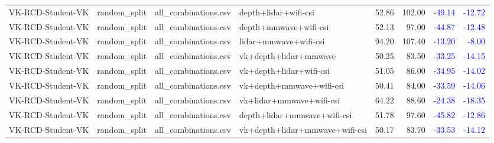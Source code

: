 \documentclass[10pt]{article}
\begin{document}
\begin{longtable}{llllrrrr}
VK-RCD-Student-VK & random\_split & all\_combinations.csv & depth+lidar+wifi-csi & 52.86 & 102.00 & \textcolor{blue}{-49.14} & \textcolor{blue}{-12.72}\\
VK-RCD-Student-VK & random\_split & all\_combinations.csv & depth+mmwave+wifi-csi & 52.13 & 97.00 & \textcolor{blue}{-44.87} & \textcolor{blue}{-12.48}\\
VK-RCD-Student-VK & random\_split & all\_combinations.csv & lidar+mmwave+wifi-csi & 94.20 & 107.40 & \textcolor{blue}{-13.20} & \textcolor{blue}{-8.00}\\
VK-RCD-Student-VK & random\_split & all\_combinations.csv & vk+depth+lidar+mmwave & 50.25 & 83.50 & \textcolor{blue}{-33.25} & \textcolor{blue}{-14.15}\\
VK-RCD-Student-VK & random\_split & all\_combinations.csv & vk+depth+lidar+wifi-csi & 51.05 & 86.00 & \textcolor{blue}{-34.95} & \textcolor{blue}{-14.02}\\
VK-RCD-Student-VK & random\_split & all\_combinations.csv & vk+depth+mmwave+wifi-csi & 50.41 & 84.00 & \textcolor{blue}{-33.59} & \textcolor{blue}{-14.06}\\
VK-RCD-Student-VK & random\_split & all\_combinations.csv & vk+lidar+mmwave+wifi-csi & 64.22 & 88.60 & \textcolor{blue}{-24.38} & \textcolor{blue}{-18.35}\\
VK-RCD-Student-VK & random\_split & all\_combinations.csv & depth+lidar+mmwave+wifi-csi & 51.78 & 97.60 & \textcolor{blue}{-45.82} & \textcolor{blue}{-12.86}\\
VK-RCD-Student-VK & random\_split & all\_combinations.csv & vk+depth+lidar+mmwave+wifi-csi & 50.17 & 83.70 & \textcolor{blue}{-33.53} & \textcolor{blue}{-14.12}\\
\bottomrule
\end{longtable}
\end{document}

